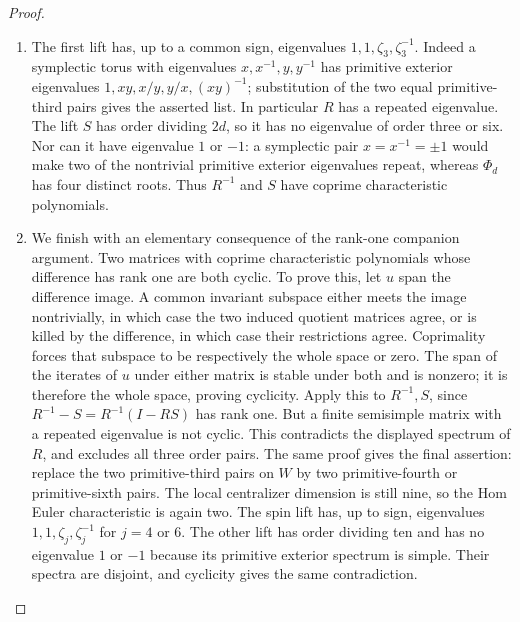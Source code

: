 \documentclass[11pt,a4paper]{article}
\theoremstyle{definition}
\begin{document}
\begin{proof}
\begin{enumerate}[label=\arabic*.]
\item The first lift has, up to a common sign, eigenvalues
$1,1,\zeta_3,\zeta_3^{-1}$.  Indeed a symplectic torus with
eigenvalues $x,x^{-1},y,y^{-1}$ has primitive exterior
eigenvalues $1,xy,x/y,y/x,(xy)^{-1}$; substitution of the
two equal primitive-third pairs gives the asserted list.
In particular $R$ has a repeated eigenvalue.
The lift $S$ has order dividing $2d$, so it has no eigenvalue
of order three or six.  Nor can it have eigenvalue $1$ or
$-1$: a symplectic pair $x=x^{-1}=\pm1$ would make two of
the nontrivial primitive exterior eigenvalues repeat, whereas
$\Phi_d$ has four distinct roots.
Thus $R^{-1}$ and $S$ have coprime characteristic polynomials.

\item We finish with an elementary consequence of the rank-one
companion argument.  Two matrices with coprime characteristic
polynomials whose difference has rank one are both cyclic.
To prove this, let $u$ span the difference image.
A common invariant subspace either meets the image nontrivially,
in which case the two induced quotient matrices agree, or is
killed by the difference, in which case their restrictions
agree.  Coprimality forces that subspace to be respectively
the whole space or zero.  The span of the iterates of $u$
under either matrix is stable under both and is nonzero;
it is therefore the whole space, proving cyclicity.
Apply this to $R^{-1},S$, since
$R^{-1}-S=R^{-1}(I-RS)$ has rank one.
But a finite semisimple matrix with a repeated eigenvalue
is not cyclic.  This contradicts the displayed spectrum of
$R$, and excludes all three order pairs.
The same proof gives the final assertion: replace the two
primitive-third pairs on $W$ by two primitive-fourth or
primitive-sixth pairs.  The local centralizer dimension
is still nine, so the Hom Euler characteristic is again two.
The spin lift has, up to sign, eigenvalues
$1,1,\zeta_j,\zeta_j^{-1}$ for $j=4$ or $6$.
The other lift has order dividing ten and has no eigenvalue
$1$ or $-1$ because its primitive exterior spectrum is
simple.  Their spectra are disjoint, and cyclicity gives
the same contradiction.

\end{enumerate}
\end{proof}
\end{document}
